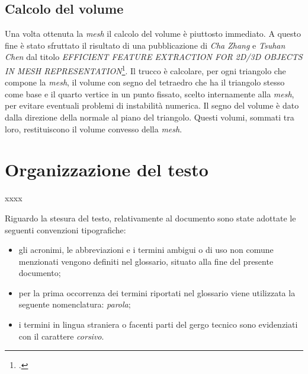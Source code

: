 \subsection{Calcolo del volume}
Una volta ottenuta la \emph{mesh} il calcolo del volume è piuttosto immediato. A questo fine è stato sfruttato il risultato di una pubblicazione di \emph{Cha Zhang} e \emph{Tsuhan Chen} dal titolo \emph{EFFICIENT FEATURE EXTRACTION FOR 2D/3D OBJECTS
IN MESH REPRESENTATION}\footcite{site: http://research.microsoft.com/en-us/um/people/chazhang/publications/icip01_ChaZhang.pdf}.
Il trucco è calcolare, per ogni triangolo che compone la \emph{mesh}, il volume con segno del tetraedro che ha il triangolo stesso come base e il quarto vertice in un punto fissato, scelto internamente alla \emph{mesh}, per evitare eventuali problemi di instabilità numerica. Il segno del volume è dato dalla direzione della normale al piano del triangolo. Questi volumi, sommati tra loro, restituiscono il volume convesso della \emph{mesh}.


\section{Organizzazione del testo}
xxxx
%
%    
%    
%    
%    
%    

Riguardo la stesura del testo, relativamente al documento sono state adottate le seguenti convenzioni tipografiche:
\begin{itemize}
	\item gli acronimi, le abbreviazioni e i termini ambigui o di uso non comune menzionati vengono definiti nel glossario, situato alla fine del presente documento;
	\item per la prima occorrenza dei termini riportati nel glossario viene utilizzata la seguente nomenclatura: \emph{parola}\glsfirstoccur;
	\item i termini in lingua straniera o facenti parti del gergo tecnico sono evidenziati con il carattere \emph{corsivo}.
\end{itemize}